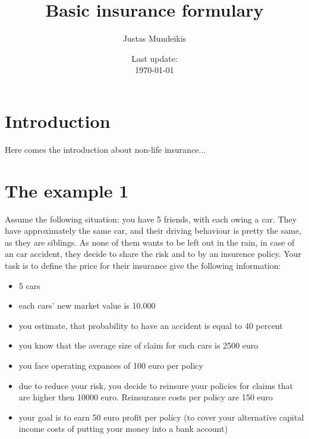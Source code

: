 \documentclass[11pt,a4paper,fleqn]{article}      %
\begin{document}
\begin{titlepage}
\title{Basic insurance formulary}
\author{Justas Mundeikis}
\date{Last update:\\ \today}
\maketitle
\thispagestyle{empty}
\vspace{0.5cm}


\end{titlepage}
\clearpage

 
 
\tableofcontents
 
\newpage
\section{Introduction}
Here comes the introduction about non-life insurance...

\section{The example 1}

Assume the following situation: you have 5 friends, with each owing a car. They have approximately the same car, and their driving behaviour is pretty the same, as they are siblings. As none of them wants to be left out in the rain, in case of an car accident, they decide to share the risk and to by an insurence policy. Your task is to define the price for their insurance give the following information:
\begin{itemize}
\item 5 cars
\item each cars' new market value is 10.000
\item you estimate, that probability to have an accident is equal to 40 percent
\item you know that the average size of claim for such cars is 2500 euro
\item you face operating expances of 100 euro per policy
\item due to reduce your risk, you decide to reinsure your policies for claims that are higher then 10000 euro. Reinsurance costs per policy are 150 euro
\item your goal is to earn 50 euro profit per policy (to cover your alternative capital income costs of putting your money into a bank account)
\end{itemize}
\end{document}
